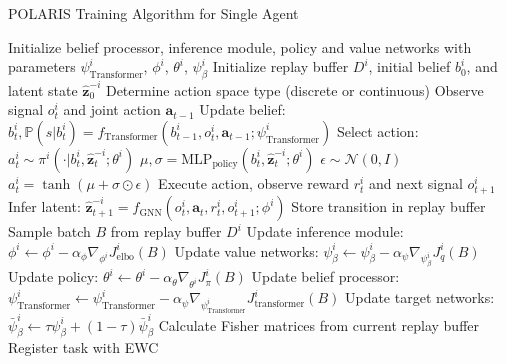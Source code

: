 \documentclass[a4paper,12pt]{report}
\begin{document}
\begin{algorithm}[H]
    \caption{POLARIS Training Algorithm for Single Agent}
    \begin{algorithmic}[1]
        \State Initialize belief processor, inference module, policy and value networks with parameters $\psi^i_{\text{Transformer}}$, $\phi^i$, $\theta^i$, $\psi^i_{\beta}$
        \State Initialize replay buffer $D^i$, initial belief $b^i_0$, and latent state $\boldsymbol{\hat{z}}^{-i}_0$
        \State Determine action space type (discrete or continuous)
        \State Observe signal $o^i_t$ and joint action $\boldsymbol{a}_{t-1}$
        \State Update belief: $b^i_t, \mathbb{P}(s|b^i_t) = f_{\text{Transformer}}(b^i_{t-1}, o^i_t, \boldsymbol{a}_{t-1}; \psi^i_{\text{Transformer}})$
        \State Select action:
        \State $a^i_t \sim \pi^i(\cdot|b^i_t, \boldsymbol{\hat{z}}^{-i}_t; \theta^i)$ 
        \Else
        \State $\mu, \sigma = \text{MLP}_{\text{policy}}(b^i_t, \boldsymbol{\hat{z}}^{-i}_t; \theta^i)$
        \State $\epsilon \sim \mathcal{N}(0, I)$
        \State $a^i_t = \tanh(\mu + \sigma \odot \epsilon)$ 
        \EndIf
        \State Execute action, observe reward $r^i_t$ and next signal $o^i_{t+1}$
        \State Infer latent: $\boldsymbol{\hat{z}}^{-i}_{t+1} = f_{\text{GNN}}(o^i_t, \boldsymbol{a}_t, r^i_t, o^i_{t+1}; \phi^i)$
        \State Store transition in replay buffer
        \State Sample batch $B$ from replay buffer $D^i$
        \State Update inference module: $\phi^i \leftarrow \phi^i - \alpha_{\phi} \nabla_{\phi^i} J^i_{\text{elbo}}(B)$
        \State Update value networks: $\psi^i_{\beta} \leftarrow \psi^i_{\beta} - \alpha_{\psi} \nabla_{\psi^i_{\beta}} J^i_{q}(B)$
        \State Update policy: $\theta^i \leftarrow \theta^i - \alpha_{\theta} \nabla_{\theta^i} J^i_{\pi}(B)$ 
        \State Update belief processor: $\psi^i_{\text{Transformer}} \leftarrow \psi^i_{\text{Transformer}} - \alpha_{\psi} \nabla_{\psi^i_{\text{Transformer}}} J^i_{\text{transformer}}(B)$
        \State Update target networks: $\bar{\psi}^i_{\beta} \leftarrow \tau \psi^i_{\beta} + (1-\tau) \bar{\psi}^i_{\beta}$
        \State Calculate Fisher matrices from current replay buffer
        \State Register task with EWC
        \EndIf
        \EndIf
        \EndFor
    \end{algorithmic}
\end{algorithm}
\end{document}
